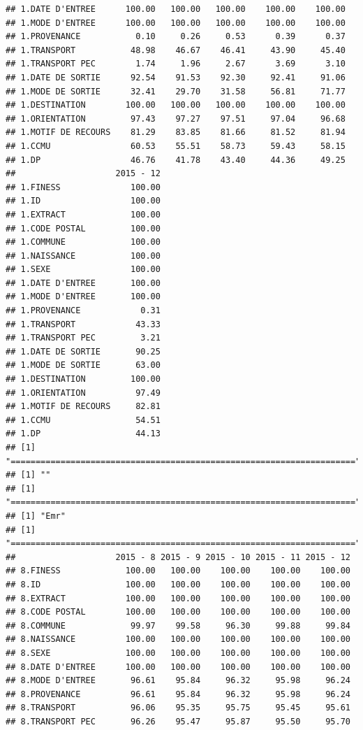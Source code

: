 \documentclass[]{article}
\begin{document}
\begin{verbatim}
## 1.DATE D'ENTREE      100.00   100.00   100.00    100.00    100.00
## 1.MODE D'ENTREE      100.00   100.00   100.00    100.00    100.00
## 1.PROVENANCE           0.10     0.26     0.53      0.39      0.37
## 1.TRANSPORT           48.98    46.67    46.41     43.90     45.40
## 1.TRANSPORT PEC        1.74     1.96     2.67      3.69      3.10
## 1.DATE DE SORTIE      92.54    91.53    92.30     92.41     91.06
## 1.MODE DE SORTIE      32.41    29.70    31.58     56.81     71.77
## 1.DESTINATION        100.00   100.00   100.00    100.00    100.00
## 1.ORIENTATION         97.43    97.27    97.51     97.04     96.68
## 1.MOTIF DE RECOURS    81.29    83.85    81.66     81.52     81.94
## 1.CCMU                60.53    55.51    58.73     59.43     58.15
## 1.DP                  46.76    41.78    43.40     44.36     49.25
##                    2015 - 12
## 1.FINESS              100.00
## 1.ID                  100.00
## 1.EXTRACT             100.00
## 1.CODE POSTAL         100.00
## 1.COMMUNE             100.00
## 1.NAISSANCE           100.00
## 1.SEXE                100.00
## 1.DATE D'ENTREE       100.00
## 1.MODE D'ENTREE       100.00
## 1.PROVENANCE            0.31
## 1.TRANSPORT            43.33
## 1.TRANSPORT PEC         3.21
## 1.DATE DE SORTIE       90.25
## 1.MODE DE SORTIE       63.00
## 1.DESTINATION         100.00
## 1.ORIENTATION          97.49
## 1.MOTIF DE RECOURS     82.81
## 1.CCMU                 54.51
## 1.DP                   44.13
## [1] "====================================================================="
## [1] ""
## [1] "====================================================================="
## [1] "Emr"
## [1] "====================================================================="
##                    2015 - 8 2015 - 9 2015 - 10 2015 - 11 2015 - 12
## 8.FINESS             100.00   100.00    100.00    100.00    100.00
## 8.ID                 100.00   100.00    100.00    100.00    100.00
## 8.EXTRACT            100.00   100.00    100.00    100.00    100.00
## 8.CODE POSTAL        100.00   100.00    100.00    100.00    100.00
## 8.COMMUNE             99.97    99.58     96.30     99.88     99.84
## 8.NAISSANCE          100.00   100.00    100.00    100.00    100.00
## 8.SEXE               100.00   100.00    100.00    100.00    100.00
## 8.DATE D'ENTREE      100.00   100.00    100.00    100.00    100.00
## 8.MODE D'ENTREE       96.61    95.84     96.32     95.98     96.24
## 8.PROVENANCE          96.61    95.84     96.32     95.98     96.24
## 8.TRANSPORT           96.06    95.35     95.75     95.45     95.61
## 8.TRANSPORT PEC       96.26    95.47     95.87     95.50     95.70

\end{verbatim}
\end{document}
